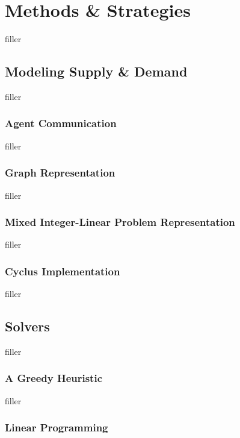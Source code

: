 \section{Methods \& Strategies}

filler

\subsection{Modeling Supply \& Demand}

filler

\subsubsection{Agent Communication}

filler


\subsubsection{Graph Representation}

filler


\subsubsection{Mixed Integer-Linear Problem Representation}

filler

\subsubsection{Cyclus Implementation}

filler


\subsection{Solvers}

filler

\subsubsection{A Greedy Heuristic}

filler

\subsubsection{Linear Programming}

